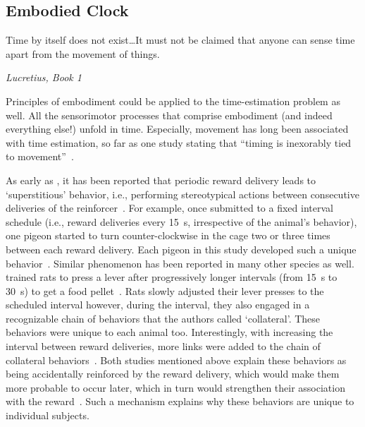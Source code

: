 \subsection{Embodied Clock}
\label{ch:intro:EmbodiedClock}
{\singlespacing \epigraph{Time by itself does not exist\ldots It must not be claimed that anyone can sense time apart from the movement of things.}
{\textit{Lucretius, Book 1}}}
\noindent
Principles of embodiment could be applied to the time-estimation problem as well.
All the sensorimotor processes that comprise embodiment (and indeed everything else!) unfold in time.
Especially, movement has long been associated with time estimation, so far as one study stating that ``timing is inexorably tied to movement''~\cite{Wiener2019eNeuro}.\footnotemark
{}
\par
As early as \citeyear{Skinner1948}, it has been reported that periodic reward delivery leads to `superstitious' behavior, i.e., performing stereotypical actions between consecutive deliveries of the reinforcer~\cite{Skinner1948}.
For example, once submitted to a fixed interval schedule (i.e., reward deliveries every 15~s, irrespective of the animal's behavior), one pigeon started to turn counter-clockwise in the cage two or three times between each reward delivery.
Each pigeon in this study developed such a unique behavior~\cite{Skinner1948}.
Similar phenomenon has been reported in many other species as well.
 trained rats to press a lever after progressively longer intervals (from 15~s to 30~s) to get a food pellet~\cite{Wilson1953}.
Rats slowly adjusted their lever presses to the scheduled interval however, during the interval, they also engaged in a recognizable chain of behaviors that the authors called `collateral'.
These behaviors were unique to each animal too.
Interestingly, with increasing the interval between reward deliveries, more links were added to the chain of collateral behaviors~\cite{Wilson1953}.
Both studies mentioned above explain these behaviors as being accidentally reinforced by the reward delivery, which would make them more probable to occur later, which in turn would strengthen their association with the reward~\cite{Killeen1988}.
Such a mechanism explains why these behaviors are unique to individual subjects.
